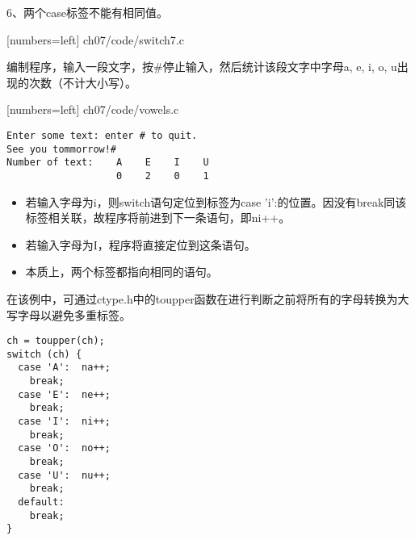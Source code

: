 \begin{frame}\ft{\secname}
6、两个case标签不能有相同值。
\end{frame}

\begin{frame}\ft{\secname}

[numbers=left]
{ch07/code/switch7.c}
\end{frame}



\begin{frame}[fragile]\ft{\secname}
  \begin{li}
    编制程序，输入一段文字，按{\tf \#}停止输入，然后统计该段文字中字母a, e, i, o, u出现的次数（不计大小写）。
  \end{li}
\end{frame}



\begin{frame}\ft{\secname}

[numbers=left]
{ch07/code/vowels.c}
\end{frame}

\begin{frame}[fragile]\ft{\secname}
\begin{lstlisting}[backgroundcolor=\color{red!10}]
Enter some text: enter # to quit.
See you tommorrow!#
Number of text:    A    E    I    U
                   0    2    0    1
\end{lstlisting}   
\end{frame}

\begin{frame}[fragile]\ft{\secname}
\begin{itemize}
\item
若输入字母为i，则switch语句定位到标签为case 'i':的位置。因没有break同该标签相关联，故程序将前进到下一条语句，即ni++。\\[0.1in]
\item 
若输入字母为I，程序将直接定位到这条语句。\\[0.1in]
\item 
本质上，两个标签都指向相同的语句。
\end{itemize} 
\end{frame}

\begin{frame}[fragile]\ft{\secname}
在该例中，可通过ctype.h中的toupper函数在进行判断之前将所有的字母转换为大写字母以避免多重标签。
\end{frame}

\begin{frame}[fragile]\ft{\secname}
\begin{lstlisting}
ch = toupper(ch);
switch (ch) {
  case 'A':  na++;
    break;
  case 'E':  ne++;
    break;
  case 'I':  ni++;
    break;
  case 'O':  no++;
    break;
  case 'U':  nu++;
    break;
  default:
    break;
}   
\end{lstlisting}           
\end{frame}

